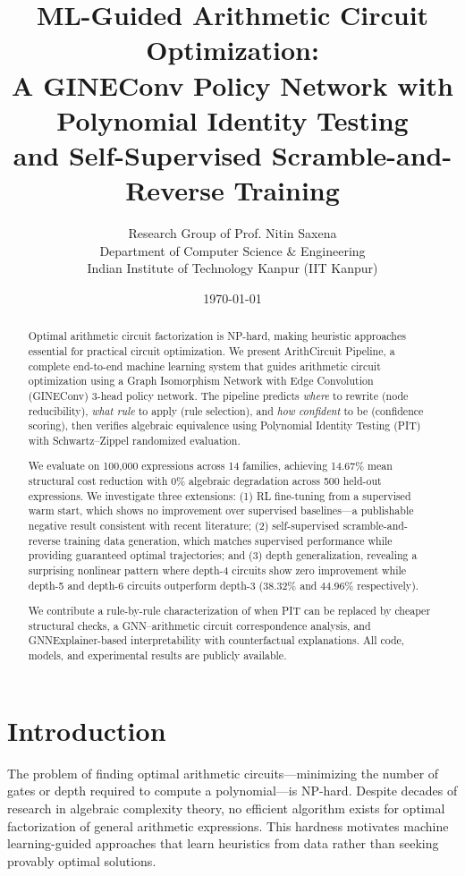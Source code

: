 \documentclass[10pt]{article}
\title{\textbf{ML-Guided Arithmetic Circuit Optimization:\\
A GINEConv Policy Network with Polynomial Identity Testing\\
and Self-Supervised Scramble-and-Reverse Training}}
\author{
    Research Group of Prof. Nitin Saxena\\
    Department of Computer Science \& Engineering\\
    Indian Institute of Technology Kanpur (IIT Kanpur)
}
\date{\today}
\begin{document}
\maketitle

\begin{abstract}
Optimal arithmetic circuit factorization is NP-hard, making heuristic approaches
essential for practical circuit optimization. We present ArithCircuit Pipeline,
a complete end-to-end machine learning system that guides arithmetic circuit
optimization using a Graph Isomorphism Network with Edge Convolution (GINEConv)
3-head policy network. The pipeline predicts \emph{where} to rewrite (node
reducibility), \emph{what rule} to apply (rule selection), and \emph{how
confident} to be (confidence scoring), then verifies algebraic equivalence using
Polynomial Identity Testing (PIT) with Schwartz–Zippel randomized evaluation.

We evaluate on 100,000 expressions across 14 families, achieving 14.67\% mean
structural cost reduction with 0\% algebraic degradation across 500 held-out
expressions. We investigate three extensions: (1) RL fine-tuning from a
supervised warm start, which shows no improvement over supervised baselines—a
publishable negative result consistent with recent literature; (2) self-supervised
scramble-and-reverse training data generation, which matches supervised
performance while providing guaranteed optimal trajectories; and (3) depth
generalization, revealing a surprising nonlinear pattern where depth-4 circuits
show zero improvement while depth-5 and depth-6 circuits outperform depth-3
(38.32\% and 44.96\% respectively).

We contribute a rule-by-rule characterization of when PIT can be replaced by
cheaper structural checks, a GNN–arithmetic circuit correspondence analysis,
and GNNExplainer-based interpretability with counterfactual explanations. All
code, models, and experimental results are publicly available.
\end{abstract}


\section{Introduction}

The problem of finding optimal arithmetic circuits—minimizing the number of
gates or depth required to compute a polynomial—is NP-hard. Despite decades of
research in algebraic complexity theory, no efficient algorithm exists for
optimal factorization of general arithmetic expressions. This hardness motivates
machine learning-guided approaches that learn heuristics from data rather than
seeking provably optimal solutions.
\end{document}
